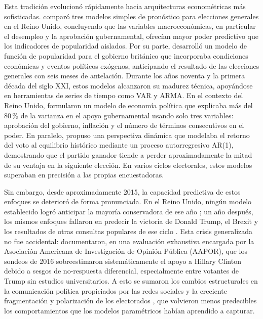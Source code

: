 Esta tradición evolucionó rápidamente hacia arquitecturas econométricas más
sofisticadas. \textcite{mughan1987} comparó tres modelos simples de pronóstico
para elecciones generales en el Reino Unido, concluyendo que las variables
macroeconómicas, en particular el desempleo y la aprobación gubernamental,
ofrecían mayor poder predictivo que los indicadores de popularidad aislados.
Por su parte, \textcite{sanders1991} desarrolló un modelo de función de
popularidad para el gobierno británico que incorporaba condiciones económicas
y eventos políticos exógenos, anticipando el resultado de las elecciones
generales con seis meses de antelación. Durante los años noventa y la primera
década del siglo XXI, estos modelos alcanzaron su madurez técnica,
apoyándose en herramientas de series de tiempo como VAR y ARMA. En el
contexto del Reino Unido, \textcite{lewisbeck2004} formularon un modelo de
economía política que explicaba más del 80\,\% de la varianza en el apoyo
gubernamental usando solo tres variables: aprobación del gobierno, inflación
y el número de términos consecutivos en el poder. En paralelo,
\textcite{norpoth2004} propuso una perspectiva dinámica que modelaba el retorno
del voto al equilibrio histórico mediante un proceso autorregresivo AR(1),
demostrando que el partido ganador tiende a perder aproximadamente la mitad
de su ventaja en la siguiente elección. En varios ciclos electorales, estos
modelos superaban en precisión a las propias encuestadoras.

Sin embargo, desde aproximadamente 2015, la capacidad predictiva de estos
enfoques se deterioró de forma pronunciada. En el Reino Unido, ningún modelo
establecido logró anticipar la mayoría conservadora de ese año
\parencite{stegmaier2023}; un año después, los mismos enfoques fallaron en
predecir la victoria de Donald Trump, el Brexit y los resultados de otras consultas populares de ese ciclo \parencite{stegmaier2023, brito2024stop}. Esta crisis
generalizada no fue accidental: \textcite{kennedy2018} documentaron, en una
evaluación exhaustiva encargada por la Asociación Americana de Investigación
de Opinión Pública (AAPOR), que los sondeos de 2016 sobreestimaron
sistemáticamente el apoyo a Hillary Clinton debido a sesgos de no-respuesta
diferencial, especialmente entre votantes de Trump sin estudios universitarios.
A esto se sumaron los cambios estructurales en la comunicación política
propiciados por las redes sociales \parencite{tucker2018} y la creciente
fragmentación y polarización de los electorados \parencite{barbera2020}, que
volvieron menos predecibles los comportamientos que los modelos paramétricos
habían aprendido a capturar.

